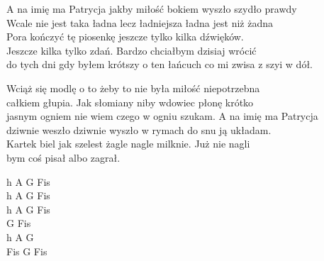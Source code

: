 \begin{text}
{    A na imię ma Patrycja jakby miłość bokiem wyszło szydło prawdy\\
    Wcale nie jest taka ładna lecz ładniejsza ładna jest niż żadna\\
    Pora kończyć tę piosenkę jeszcze tylko kilka dźwięków.\\
    Jeszcze kilka tylko zdań. Bardzo chciałbym dzisiaj wrócić\\
    do tych dni gdy byłem krótszy o ten łańcuch co mi zwisa z szyi w dół.

    Wciąż się modlę o to żeby to nie była miłość niepotrzebna\\
    całkiem głupia. Jak słomiany niby wdowiec płonę krótko\\
    jasnym ogniem nie wiem czego w ogniu szukam. A na imię ma Patrycja\\
    dziwnie weszło dziwnie wyszło w rymach do snu ją układam.\\
    Kartek biel jak szelest żagle nagle milknie. Już nie nagli\\
    bym coś pisał albo zagrał.
    }
\end{text}
\begin{chord}
\footnotesize{
    h A G Fis\\
    h A G Fis\\
    h A G Fis\\
    G Fis\\
    h A G\\
    Fis G Fis
}
\end{chord}